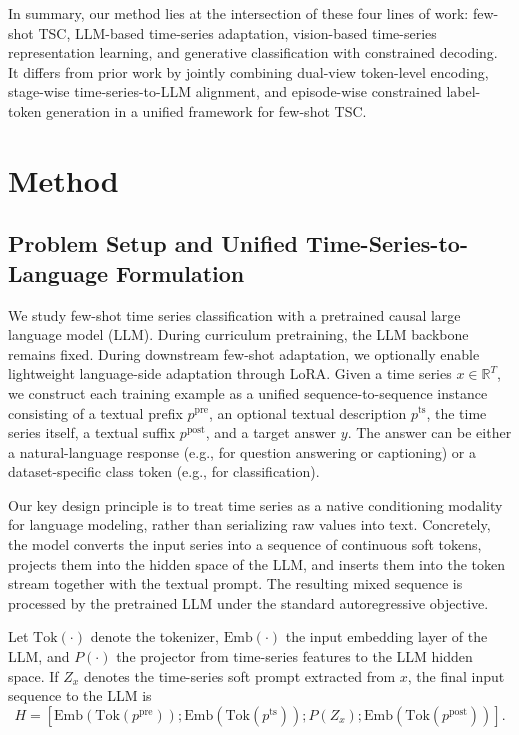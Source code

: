 \documentclass{article}
\begin{document}
    In summary, our method lies at the intersection of these four lines of work: few-shot TSC, LLM-based time-series adaptation, vision-based time-series representation learning, and generative classification with constrained decoding. It differs from prior work by jointly combining dual-view token-level encoding, stage-wise time-series-to-LLM alignment, and episode-wise constrained label-token generation in a unified framework for few-shot TSC.


\section{Method}
    
    \subsection{Problem Setup and Unified Time-Series-to-Language Formulation}
    \label{sec:unified-formulation}
    
    We study few-shot time series classification with a pretrained causal large language model (LLM).
    During curriculum pretraining, the LLM backbone remains fixed.
    During downstream few-shot adaptation, we optionally enable lightweight language-side adaptation through LoRA.
    Given a time series $x \in \mathbb{R}^{T}$, we construct each training example as a unified sequence-to-sequence instance consisting of a textual prefix $p^{\text{pre}}$, an optional textual description $p^{\text{ts}}$, the time series itself, a textual suffix $p^{\text{post}}$, and a target answer $y$.
    The answer can be either a natural-language response (e.g., for question answering or captioning) or a dataset-specific class token (e.g., for classification).
    
    Our key design principle is to treat time series as a native conditioning modality for language modeling, rather than serializing raw values into text.
    Concretely, the model converts the input series into a sequence of continuous soft tokens, projects them into the hidden space of the LLM, and inserts them into the token stream together with the textual prompt.
    The resulting mixed sequence is processed by the pretrained LLM under the standard autoregressive objective.
    
    Let $\mathrm{Tok}(\cdot)$ denote the tokenizer, $\mathrm{Emb}(\cdot)$ the input embedding layer of the LLM, and $P(\cdot)$ the projector from time-series features to the LLM hidden space.
    If $Z_x$ denotes the time-series soft prompt extracted from $x$, the final input sequence to the LLM is
    \begin{equation}
    H =
    \left[
    \mathrm{Emb}(\mathrm{Tok}(p^{\text{pre}}));
    \mathrm{Emb}(\mathrm{Tok}(p^{\text{ts}}));
    P(Z_x);
    \mathrm{Emb}(\mathrm{Tok}(p^{\text{post}}))
    \right].
    \end{equation}
    
\end{document}
